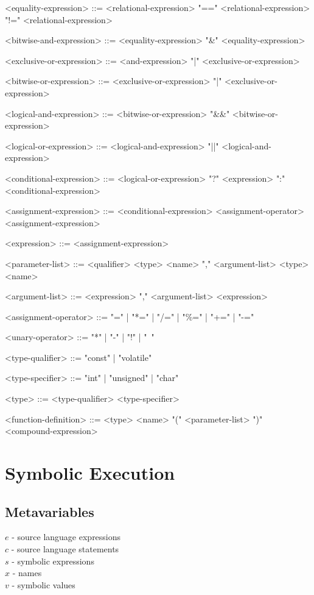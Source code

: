 \documentclass{article}
\begin{document}
\begin{grammar}
<equality-expression> ::= <relational-expression>
   "==" <relational-expression>
   "!=" <relational-expression>

<bitwise-and-expression> ::= <equality-expression>
   "&" <equality-expression>

<exclusive-or-expression> ::= <and-expression>
   "|" <exclusive-or-expression>

<bitwise-or-expression> ::= <exclusive-or-expression>
   "|" <exclusive-or-expression>

<logical-and-expression> ::= <bitwise-or-expression>
   "&&" <bitwise-or-expression>

<logical-or-expression> ::= <logical-and-expression>
   "||" <logical-and-expression>

<conditional-expression> ::= <logical-or-expression>
   "?" <expression> ":" <conditional-expression>

<assignment-expression> ::= <conditional-expression>
   <assignment-operator> <assignment-expression>

<expression> ::= <assignment-expression>

<parameter-list> ::= <qualifier> <type> <name> "," <argument-list>
   <type> <name>

<argument-list> ::= <expression> "," <argument-list>
  \alt <expression>

<assignment-operator> ::= "=" | "*=" | "/=" | "\%=" | "+=" | "-="

<unary-operator> ::= "*" | "-" | "!" | "~"

<type-qualifier> ::= "const" | "volatile"

<type-specifier> ::= "int" | "unsigned" | "char" %

<type> ::= <type-qualifier> <type-specifier>

<function-definition> ::= <type> <name> "(" <parameter-list> ")" <compound-expression>

\end{grammar}

\section{Symbolic Execution}

\subsection{Metavariables}
$e$ - source language expressions\\
$c$ - source language statements\\
$s$ - symbolic expressions\\
$x$ - names\\
$v$ - symbolic values\\
\end{document}
